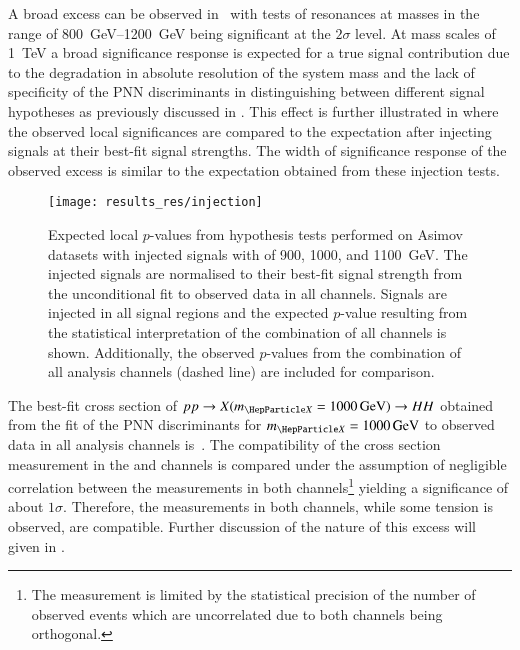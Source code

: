 A broad excess can be observed in~ with tests
of resonances at masses in the range of \SIrange{800}{1200}{\GeV}
being significant at the $2\sigma$ level. At mass scales of
\SI{1}{\TeV} a broad significance response is expected for a true
signal contribution due to the degradation in absolute resolution of
the \HH system mass and the lack of specificity of the PNN
discriminants in distinguishing between different signal hypotheses as
previously discussed in . This effect is further
illustrated in  where the observed
local significances are compared to the expectation after injecting
signals at their best-fit signal strengths. The width of significance
response of the observed excess is similar to the expectation obtained
from these injection tests.

\begin{figure}[htbp]
  \centering

  \texttt{[image: results\_res/injection]}

  \caption{Expected local $p$-values from hypothesis tests performed
    on Asimov datasets with injected signals with \mX of 900, 1000,
    and \SI[group-minimum-digits=5]{1100}{\GeV}. The injected signals
    are normalised to their best-fit signal strength from the
    unconditional fit to observed data in all channels.  Signals are
    injected in all signal regions and the expected $p$-value
    resulting from the statistical interpretation of the combination
    of all channels is shown. Additionally, the observed $p$-values
    from the combination of all analysis channels (dashed line) are
    included for comparison.}
  \label{fig:local_pvalues_injected}
\end{figure}

The best-fit cross section of $pp \to X(\mX = \SI{1000}{\GeV}) \to HH$
obtained from the fit of the PNN discriminants for
$\mX = \SI{1000}{\GeV}$ to observed data in all analysis channels
is~. The compatibility of the
cross section measurement in the \hadhad and \lephad channels is
compared under the assumption of negligible correlation between the
measurements in both channels\footnote{The measurement is limited by
  the statistical precision of the number of observed events which are
  uncorrelated due to both channels being orthogonal.} yielding a
significance of about $1\sigma$. Therefore, the measurements in both
channels, while some tension is observed, are compatible. Further
discussion of the nature of this excess will given in
.

